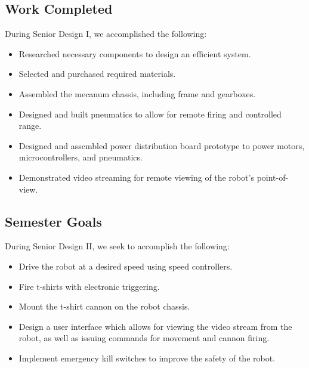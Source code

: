 \documentclass[letterpaper,12pt]{article}
\begin{document}
\subsection{Work Completed}
During Senior Design I, we accomplished the following:
\begin{itemize}
\item Researched necessary components to design an efficient system.
\item Selected and purchased required materials.
\item Assembled the mecanum chassis, including frame and gearboxes.
\item Designed and built pneumatics to allow for remote firing and controlled range.
\item Designed and assembled power distribution board prototype to power motors, microcontrollers, and pneumatics.
\item Demonstrated video streaming for remote viewing of the robot's point-of-view.
\end{itemize}

\subsection{Semester Goals}
During Senior Design II, we seek to accomplish the following:
\begin{itemize}
\item Drive the robot at a desired speed using speed controllers.
\item Fire t-shirts with electronic triggering.
\item Mount the t-shirt cannon on the robot chassis.
\item Design a user interface which allows for viewing the video stream from the robot, as well as issuing commands for movement and cannon firing.
\item Implement emergency kill switches to improve the safety of the robot.
\end{itemize}
\end{document}
